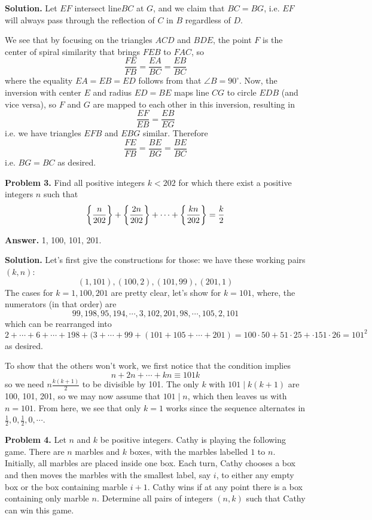 \documentclass[11pt,a4paper]{article}
\begin{document}
	    \textbf{Solution.} 
	    Let $EF$ intersect line$ BC$ at $G$, and we claim that $BC=BG$, 
	    i.e. $EF$ will always pass through the reflection of $C$ in $B$ regardless of $D$. 
	    
	    We see that by focusing on the triangles $ACD$ and $BDE$, 
	    the point $F$ is the center of spiral similarity that brings $FEB$ to $FAC$, so 
	    \[
	    \frac{FE}{FB}=\frac{EA}{BC}=\frac{EB}{BC}
	    \]
	    where the equality $EA=EB=ED$ follows from that $\angle B=90^{\circ}$. 
	    Now, the inversion with center $E$ and radius $ED=BE$ maps line $CG$ to circle $EDB$ 
	    (and vice versa), so $F$ and $G$ are mapped to each other in this inversion, resulting in 
	    \[
	    \frac{EF}{EB} = \frac{EB}{EG}
	    \]
	    i.e. we have triangles $EFB$ and $EBG$ similar. Therefore 
	    \[
	    \frac{FE}{FB}=\frac{BE}{BG}=\frac{BE}{BC}
	    \]
	    i.e. $BG=BC$ as desired. 
	    
	    \textbf{Problem 3.} 
	    Find all positive integers $k<202$ for which there exist a positive integers $n$ such that
	    $$\bigg {\{}\frac{n}{202}\bigg {\}}+\bigg {\{}\frac{2n}{202}\bigg {\}}+\cdots +\bigg {\{}\frac{kn}{202}\bigg {\}}=\frac{k}{2}$$
	    
	    \textbf{Answer.} 
	    1, 100, 101, 201. 
	    
	    \textbf{Solution.} 
	    Let's first give the constructions for those: we have these working pairs $(k, n)$: 
	    \[
	    (1, 101), (100, 2), (101, 99), (201, 1)
	    \]
	    The cases for $k=1, 100, 201$ are pretty clear, let's show for $k=101$, where, the numerators (in that order) are 
	    \[
	    99,198,95,194,\cdots, 3, 102, 201, 98, \cdots, 105, 2, 101
	    \]
	    which can be rearranged into 
	    \[
	    2+\cdots + 6 + \cdots +198+(3+\cdots + 99 + (101+105+\cdots + 201)
	    =100\cdot 50+51\cdot 25+\cdot 151\cdot 26
	    =101^2
	    \]
	    as desired. 
	    
	    To show that the others won't work, we first notice that the condition implies 
	    \[
	    n+2n+\cdots + kn\equiv 101k
	    \]
	    so we need $n\frac{k(k+1)}{2}$ to be divisible by 101. 
	    The only $k$ with $101\mid k(k+1)$ are 100, 101, 201, so 
	    we may now assume that $101\mid n$, 
	    which then leaves us with $n=101$. 
	    From here, we see that only $k=1$ works since the sequence alternates in $\frac 12, 0, \frac 12, 0, \cdots$. 
	    
	    \textbf{Problem 4.}
	    Let $n$ and $k$ be positive integers. Cathy is playing the following game. There are $n$ marbles and $k$ boxes, with the marbles labelled $1$ to $n$. Initially, all marbles are placed inside one box. Each turn, Cathy chooses a box and then moves the marbles with the smallest label, say $i$, to either any empty box or the box containing marble $i+1$. Cathy wins if at any point there is a box containing only marble $n$.
	    Determine all pairs of integers $(n,k)$ such that Cathy can win this game.
	    
\end{document}
